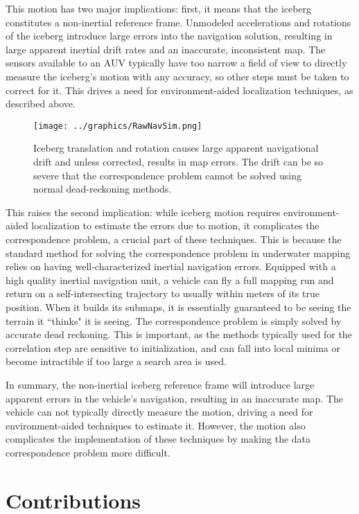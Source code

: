 This motion has two major implications: first, it means that the iceberg constitutes a non-inertial reference frame. Unmodeled accelerations and rotations of the iceberg introduce large errors into the navigation solution, resulting in large apparent inertial drift rates and an inaccurate, inconsistent map. The sensors available to an AUV typically have too narrow a field of view to directly measure the iceberg's motion with any accuracy, so other steps must be taken to correct for it. This drives a need for environment-aided localization techniques, as described above. 


\begin{figure}[htbp]
   \centering
   \texttt{[image: ../graphics/RawNavSim.png]} %
   \caption{Iceberg translation and rotation causes large apparent navigational drift and unless corrected, results in map errors. The drift can be so severe that the correspondence problem cannot be solved using normal dead-reckoning methods.}
   \label{fig:naiveMapping}
\end{figure}

This raises the second implication: while iceberg motion requires environment-aided localization to estimate the errors due to motion, it complicates the correspondence problem, a crucial part of these techniques. This is because the standard method for solving the correspondence problem in underwater mapping relies on having well-characterized inertial navigation errors. Equipped with a high quality inertial navigation unit, a vehicle can fly a full mapping run and return on a self-intersecting trajectory to usually within meters of its true position. When it builds its submaps, it is essentially guaranteed to be seeing the terrain it ``thinks" it is seeing. The correspondence problem is simply solved by accurate dead reckoning. This is important, as the methods typically used for the correlation step are sensitive to initialization, and can fall into local minima or become intractible if too large a search area is used. 

In summary, the non-inertial iceberg reference frame will introduce large apparent errors in the vehicle's navigation, resulting in an inaccurate map. The vehicle can not typically directly measure the motion, driving a need for environment-aided techniques to estimate it. However, the motion also complicates the implementation of these techniques by making the data correspondence problem more difficult.

\section{Contributions}


